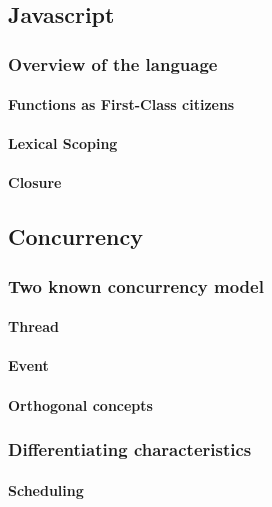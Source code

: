 \chapter{}

  \section{Javascript}
    \subsection{Overview of the language}
      \subsubsection{Functions as First-Class citizens}
      \subsubsection{Lexical Scoping}
      \subsubsection{Closure}

  \section{Concurrency}
    \subsection{Two known concurrency model}
      \subsubsection{Thread}
      \subsubsection{Event}
      \subsubsection{Orthogonal concepts}
    \subsection{Differentiating characteristics}
      \subsubsection{Scheduling}
